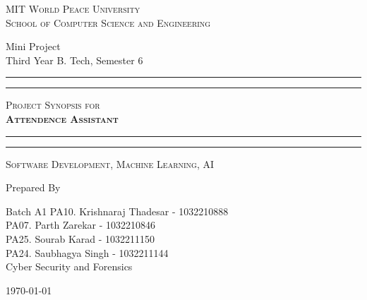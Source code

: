 \documentclass[11pt]{article}
\begin{document}
\begin{titlepage}
    \centering


    \huge\textsc{
        MIT World Peace University\\
        School of Computer Science and Engineering
    }\\

    \vspace{0.75\baselineskip} %

    \LARGE{
        Mini Project\\
        Third Year B. Tech, Semester 6
    }

    \vfill %


    \rule{\textwidth}{1.6pt}\vspace*{-\baselineskip}\vspace*{2pt}
    \rule{\textwidth}{0.6pt}
    \vspace{0.75\baselineskip} %



    \huge{\textsc{
        Project Synopsis for\\
        \textbf{Attendence Assistant}
        }} \\



    \vspace{0.5\baselineskip} %
    \rule{\textwidth}{0.6pt}\vspace*{-\baselineskip}\vspace*{2.8pt}
    \rule{\textwidth}{1.6pt}

    \vspace{1\baselineskip} %


    \LARGE\textsc{
        Software Development, Machine Learning, AI\\
    } %
    \vfill


    Prepared By
    \vspace{0.5\baselineskip} %

    \Large{
        Batch A1
        PA10. Krishnaraj Thadesar - 1032210888\\
        PA07. Parth Zarekar - 1032210846\\
        PA25. Sourab Karad - 1032211150\\
        PA24. Saubhagya Singh - 1032211144\\
        Cyber Security and Forensics\\
    }


    \vspace{0.5\baselineskip} %
    \today

\end{titlepage}
\end{document}
